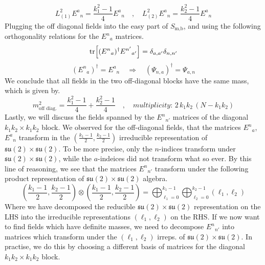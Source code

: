 %
%
\begin{equation}
L_{(1)}^2 {E^a}_n
=
\frac{k_1^2 - 1}{4}
{E^a}_n
%
\quad , \quad
%
L_{(2)}^2 {E^a}_n
=
\frac{k_2^2 - 1}{4}
{E^a}_n
\end{equation}
%
%
Plugging the off diagonal fields into the easy part of $S_{\text{m,b}}$, and using the following orthogonality relations for the ${E^n}_a$ matrices.
%
%
\begin{equation*}
\tr[ ({E^n}_a)^\dagger {E^{n'}}_{a'} ] = \delta_{a,a'} \delta_{n,n'}
\end{equation*}
%
%
\begin{equation}
({E^n}_a)^\dagger = {E^a}_n
%
\quad \Rightarrow \quad
%
(\Psi_{n,a})^\dagger = \Psi_{a,n}
\end{equation}
%
%
We conclude that all fields in the two off-diagonal blocks have the same mass, which is given by.
%
%
\begin{equation}
m^2_{\text{off diag.}} = \frac{k_1^2-1}{4} + \frac{k_2^2-1}{4}
%
\quad , \quad
%
\textit{multiplicity: } 2 \, k_1 k_2 \, (N - k_1 k_2)
\end{equation}
%
%
Lastly, we will discuss the fields spanned by the ${E^n}_{n'}$ matrices of the diagonal $k_1 k_2 \times k_1 k_2$ block. We observed for the off-diagonal fields, that the matrices ${E^n}_a$, ${E^a}_n$ transform in the $\left( \frac{k_1-1}{2}, \frac{k_2-1}{2} \right)$ irreducible representation of $\mathfrak{su}(2) \times \mathfrak{su}(2)$. To be more precise, only the $n$-indices transform under $\mathfrak{su}(2) \times \mathfrak{su}(2)$, while the $a$-indeices did not transform what so ever. By this line of reasoning, we see that the matrices ${E^n}_{n'}$ transform under the following product representation of $\mathfrak{su}(2) \times \mathfrak{su}(2)$ algebra.
%
%
\begin{equation}\label{su(2) decomposition}
\left( \frac{k_1-1}{2}, \frac{k_2-1}{2} \right)
\otimes
\left( \frac{k_1-1}{2}, \frac{k_2-1}{2} \right)
=
\bigoplus_{\ell_1=0}^{k_1-1}
\bigoplus_{\ell_2=0}^{k_2-1}
(\ell_1, \ell_2)
\end{equation}
%
%
Where we have decomposed the reducible $\mathfrak{su}(2) \times \mathfrak{su}(2)$ representation on the LHS into the irreducible representations $(\ell_1,\ell_2)$ on the RHS. If we now want to find fields which have definite masses, we need to decompose ${E^n}_{n'}$ into matrices which transform under the $(\ell_1, \ell_2)$ irreps. of $\mathfrak{su}(2) \times \mathfrak{su}(2)$. In practise, we do this by choosing a different basis of matrices for the diagonal $k_1 k_2 \times k_1 k_2$ block.
